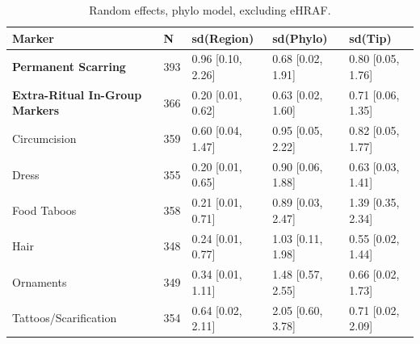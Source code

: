 \begin{table}[!ht]
\centering
\small
\caption{Random effects, phylo model, excluding eHRAF.}
\label{tab:extnoehraf_random_effects_phylo}
\begin{tabular}{lllll}
\toprule
Marker & N & sd(Region) & sd(Phylo) & sd(Tip) \\
\midrule
\textbf{Permanent Scarring} & 393 & 0.96 [0.10, 2.26] & 0.68 [0.02, 1.91] & 0.80 [0.05, 1.76] \\
\textbf{Extra-Ritual In-Group Markers} & 366 & 0.20 [0.01, 0.62] & 0.63 [0.02, 1.60] & 0.71 [0.06, 1.35] \\
\midrule
Circumcision & 359 & 0.60 [0.04, 1.47] & 0.95 [0.05, 2.22] & 0.82 [0.05, 1.77] \\
Dress & 355 & 0.20 [0.01, 0.65] & 0.90 [0.06, 1.88] & 0.63 [0.03, 1.41] \\
Food Taboos & 358 & 0.21 [0.01, 0.71] & 0.89 [0.03, 2.47] & 1.39 [0.35, 2.34] \\
Hair & 348 & 0.24 [0.01, 0.77] & 1.03 [0.11, 1.98] & 0.55 [0.02, 1.44] \\
Ornaments & 349 & 0.34 [0.01, 1.11] & 1.48 [0.57, 2.55] & 0.66 [0.02, 1.73] \\
Tattoos/Scarification & 354 & 0.64 [0.02, 2.11] & 2.05 [0.60, 3.78] & 0.71 [0.02, 2.09] \\
\bottomrule
\end{tabular}
\end{table}